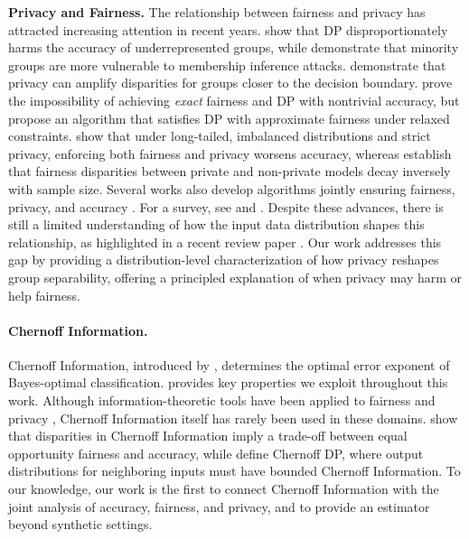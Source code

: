 \documentclass[11pt,letterpaper]{article}
\begin{document}
\textbf{Privacy and Fairness.}
The relationship between fairness and privacy has attracted increasing attention in recent years. \citet{bagdasaryan2019differential} show that DP disproportionately harms the accuracy of underrepresented groups, while \citet{chang2021privacy} demonstrate that minority groups are more vulnerable to membership inference attacks.  \citet{tran2021differentially} demonstrate that privacy can amplify disparities for groups closer to the decision boundary.
\citet{cummings2019compatibility} prove the impossibility of achieving \textit{exact} fairness and DP with nontrivial accuracy, but propose an algorithm that satisfies DP with approximate fairness under relaxed constraints. \citet{sanyal2022unfair} show that under long-tailed, imbalanced distributions and strict privacy, enforcing both fairness and privacy worsens accuracy, whereas \citet{mangold2023differential} establish that fairness disparities between private and non-private models decay inversely with sample size.
Several works also develop algorithms jointly ensuring fairness, privacy, and accuracy \citep{lyu2020differentiallyprivaterepresentationnlp, lowy2023stochasticoptimizationframeworkfair, ghoukasian2024differentially, jagielski2019differentially}. 
For a survey, see \citet{fioretto2022differential} and \citet{shahamsurvey}. Despite these advances, there is still a limited understanding of how the input data distribution shapes this relationship, as highlighted in a recent review paper \citep{yao2025sok}. Our work addresses this gap by providing a distribution-level characterization of how privacy reshapes group separability, offering a principled explanation of when privacy may harm or help fairness.
\paragraph{Chernoff Information.}
Chernoff Information, introduced by \citet{chernoff1952measure}, determines the optimal error exponent of Bayes-optimal classification. 
 \citet{nielsen2011, Nielsen_2013, nielsen2022revisiting} provides key properties we exploit throughout this work. 
Although information-theoretic tools have been applied to fairness and privacy \citep{ghassami2018fairnesssupervisedlearninginformation}, Chernoff Information itself has rarely been used in these domains. 
\citet{dutta2020there} show that disparities in Chernoff Information imply a trade-off between equal opportunity fairness and accuracy, while \citet{unsal2024} define Chernoff DP, where output distributions for neighboring inputs must have bounded Chernoff Information.
To our knowledge, our work is the first to connect Chernoff Information with the joint analysis of accuracy, fairness, and privacy, and to provide an estimator beyond synthetic settings.
\end{document}
